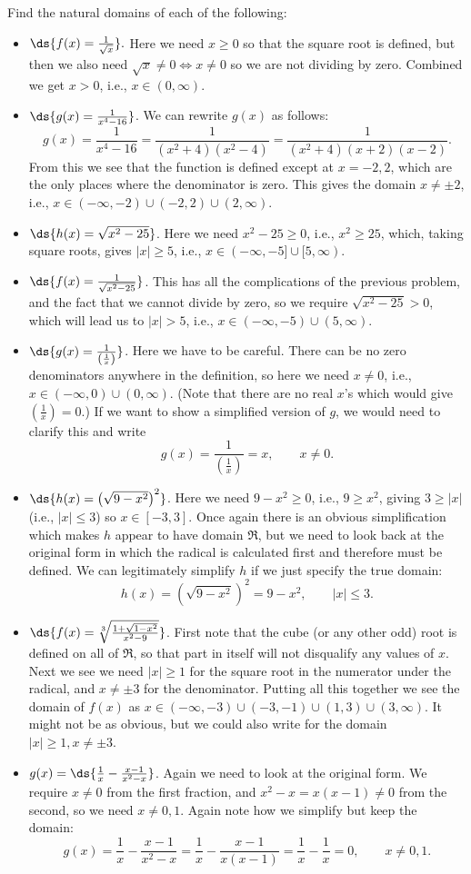 \bex Find the natural domains of each of the following:
\begin{itemize}
\item $\ds{f(x)=\frac{1}{\sqrt{x}}}.$
Here we need $x\ge 0$ so that the square root is defined, but
then we also need $\sqrt{x}\ne0\iff x\ne 0$ so we are not
dividing by zero.  Combined we get $x>0$, i.e., $x\in(0,\infty)$.
\item  $\ds{g(x)=\frac1{x^4-16}}$.  We can rewrite $g(x)$ as follows:
$$g(x)=\frac1{x^4-16}=\frac1{(x^2+4)(x^2-4)}=\frac1{(x^2+4)(x+2)(x-2)}.$$
From this we see that the function is defined except at $x=-2,2$,
which are the only places where the denominator is zero.
This gives the domain $x\ne\pm2$, i.e., $x\in(-\infty,-2)\cup
(-2,2)\cup(2,\infty)$.
\item $\ds{h(x)=\sqrt{x^2-25}}$.  Here we need $x^2-25\ge 0$, 
i.e., $x^2\ge25$, which, taking square roots, gives
$|x|\ge 5$, i.e., $x\in(-\infty,-5]\cup[5,\infty)$.
\item $\ds{f(x)=\frac1{\sqrt{x^2-25}}}$.  This has all the complications
of the previous problem, and the fact that we cannot divide by
zero, so we require $\sqrt{x^2-25}>0$, which will lead us to
$|x|>5$, i.e., $x\in(-\infty,-5)\cup(5,\infty)$.
\item $\ds{g(x)=\frac1{\left(\frac1x\right)}}$.  Here we have to be careful.
There can be no zero denominators anywhere in the definition, so
here we need $x\ne0$, i.e., $x\in(-\infty,0)\cup(0,\infty)$.  
(Note that there are no real $x$'s 
which would give $\left(\frac1x\right)=0$.)  If we want to show
a simplified version of $g$, we would need to clarify this and
write
$$g(x)=\frac1{\left(\frac1x\right)}=x, \qquad x\ne0.$$
\item $\ds{h(x)=\left(\sqrt{9-x^2}\right)^2}$.
Here we need $9-x^2\ge0$, i.e., $9\ge x^2$, giving
$3\ge|x|$ (i.e., $|x|\le3$) so $x\in[-3,3]$.  Once
again there is an obvious simplification which 
makes $h$ appear to have domain $\Re$, but we need to
look back at the original form in which the radical
is calculated first and therefore must be defined.
We can legitimately simplify $h$ if we just specify the true domain:
$$h(x)=\left(\sqrt{9-x^2}\right)^2=9-x^2,\qquad |x|\le3.$$
\item $\ds{f(x)=\sqrt[3]{\frac{1+\sqrt{1-x^2}}{x^2-9}}}$.
First note that the cube (or any other odd) root is defined
on all of $\Re$, so that part in itself will not disqualify
any values of $x$.  Next we see we need $|x|\ge1$ for the
square root in the numerator under the radical, and $x\ne\pm3$
for the denominator.  Putting all this together we see
the domain of $f(x)$ as $x\in(-\infty,-3)\cup(-3,-1)\cup(1,3)
\cup(3,\infty)$.  It might not be as obvious, but we 
could also write for the domain  $|x|\ge1, x\ne\pm3$. 
\item $g(x)=\ds{\frac1x-\frac{x-1}{x^2-x}}$.  Again we need
to look at the original form. We require $x\ne0$ from the first
fraction, and $x^2-x=x(x-1)\ne0$ from the second, so we need
$x\ne0,1$.  Again note how we simplify but keep the domain:
$$g(x)=\frac1x-\frac{x-1}{x^2-x}=\frac1x-\frac{x-1}{x(x-1)}
=\frac1x-\frac1x=0,\qquad x\ne0,1.$$
\end{itemize}
